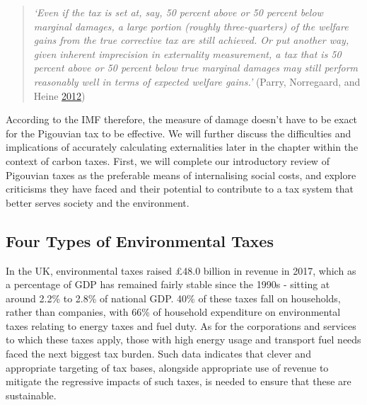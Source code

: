 \documentclass[]{tufte-handout}
\begin{document}
\begin{quote}
\emph{`Even if the tax is set at, say, 50 percent above or 50 percent
below marginal damages, a large portion (roughly three-quarters) of the
welfare gains from the true corrective tax are still achieved. Or put
another way, given inherent imprecision in externality measurement, a
tax that is 50 percent above or 50 percent below true marginal damages
may still perform reasonably well in terms of expected welfare gains.'}
(Parry, Norregaard, and Heine \protect\hyperlink{ref-Parry2012}{2012})
\end{quote}

According to the IMF therefore, the measure of damage doesn't have to be
exact for the Pigouvian tax to be effective. We will further discuss the
difficulties and implications of accurately calculating externalities
later in the chapter within the context of carbon taxes. First, we will
complete our introductory review of Pigouvian taxes as the preferable
means of internalising social costs, and explore criticisms they have
faced and their potential to contribute to a tax system that better
serves society and the environment.

\hypertarget{four-types-of-environmental-taxes}{%
\subsection{Four Types of Environmental
Taxes}\label{four-types-of-environmental-taxes}}

In the UK, environmental taxes raised £48.0 billion in revenue in 2017,
which as a percentage of GDP has remained fairly stable since the 1990s
- sitting at around 2.2\% to 2.8\% of national GDP. 40\% of these taxes
fall on households, rather than companies, with 66\% of household
expenditure on environmental taxes relating to energy taxes and fuel
duty. As for the corporations and services to which these taxes apply,
those with high energy usage and transport fuel needs faced the next
biggest tax burden. Such data indicates that clever and appropriate
targeting of tax bases, alongside appropriate use of revenue to mitigate
the regressive impacts of such taxes, is needed to ensure that these are
sustainable.
\end{document}
